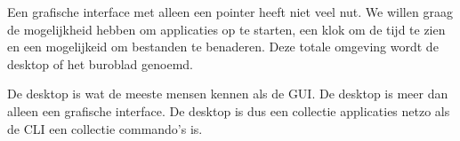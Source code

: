 Een grafische interface met alleen een pointer heeft niet veel nut. We willen graag de mogelijkheid hebben om applicaties op te starten, een klok om de tijd te zien en een mogelijkeid om bestanden te benaderen. Deze totale omgeving wordt de desktop of het buroblad genoemd.

De desktop is wat de meeste mensen kennen als de GUI. De desktop is meer dan alleen een grafische interface. De desktop is dus een collectie applicaties netzo als de CLI een collectie commando's is.

